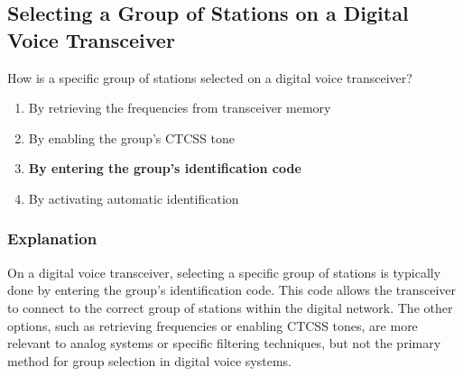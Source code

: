 \subsection{Selecting a Group of Stations on a Digital Voice Transceiver}
\label{T4B09}

\begin{tcolorbox}[colback=gray!10!white,colframe=black!75!black,title=T4B09]
How is a specific group of stations selected on a digital voice transceiver?
\begin{enumerate}[noitemsep]
    \item By retrieving the frequencies from transceiver memory
    \item By enabling the group’s CTCSS tone
    \item \textbf{By entering the group’s identification code}
    \item By activating automatic identification
\end{enumerate}
\end{tcolorbox}

\subsubsection*{Explanation}
On a digital voice transceiver, selecting a specific group of stations is typically done by entering the group’s identification code. This code allows the transceiver to connect to the correct group of stations within the digital network. The other options, such as retrieving frequencies or enabling CTCSS tones, are more relevant to analog systems or specific filtering techniques, but not the primary method for group selection in digital voice systems.